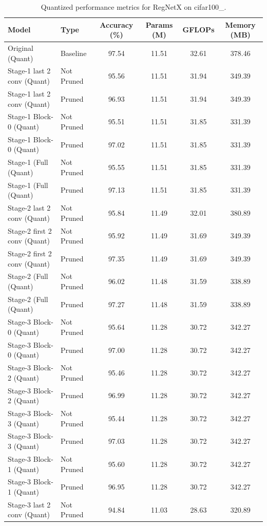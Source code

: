 \begin{table}
\caption{Quantized performance metrics for RegNetX on cifar100_.}
\label{tab:RegNetX_cifar100__quant}
\begin{tabular}{llcccc}
\toprule
Model & Type & Accuracy (\%) & Params (M) & GFLOPs & Memory (MB) \\
\midrule
Original
(Quant) & Baseline & 97.54 & 11.51 & 32.61 & 378.46 \\
Stage-1 last 2 conv
(Quant) & Not Pruned & 95.56 & 11.51 & 31.94 & 349.39 \\
Stage-1 last 2 conv
(Quant) & Pruned & 96.93 & 11.51 & 31.94 & 349.39 \\
Stage-1 Block-0
(Quant) & Not Pruned & 95.51 & 11.51 & 31.85 & 331.39 \\
Stage-1 Block-0
(Quant) & Pruned & 97.02 & 11.51 & 31.85 & 331.39 \\
Stage-1 (Full
(Quant) & Not Pruned & 95.55 & 11.51 & 31.85 & 331.39 \\
Stage-1 (Full
(Quant) & Pruned & 97.13 & 11.51 & 31.85 & 331.39 \\
Stage-2 last 2 conv
(Quant) & Not Pruned & 95.84 & 11.49 & 32.01 & 380.89 \\
Stage-2 first 2 conv
(Quant) & Not Pruned & 95.92 & 11.49 & 31.69 & 349.39 \\
Stage-2 first 2 conv
(Quant) & Pruned & 97.35 & 11.49 & 31.69 & 349.39 \\
Stage-2 (Full
(Quant) & Not Pruned & 96.02 & 11.48 & 31.59 & 338.89 \\
Stage-2 (Full
(Quant) & Pruned & 97.27 & 11.48 & 31.59 & 338.89 \\
Stage-3 Block-0
(Quant) & Not Pruned & 95.64 & 11.28 & 30.72 & 342.27 \\
Stage-3 Block-0
(Quant) & Pruned & 97.00 & 11.28 & 30.72 & 342.27 \\
Stage-3 Block-2
(Quant) & Not Pruned & 95.46 & 11.28 & 30.72 & 342.27 \\
Stage-3 Block-2
(Quant) & Pruned & 96.99 & 11.28 & 30.72 & 342.27 \\
Stage-3 Block-3
(Quant) & Not Pruned & 95.44 & 11.28 & 30.72 & 342.27 \\
Stage-3 Block-3
(Quant) & Pruned & 97.03 & 11.28 & 30.72 & 342.27 \\
Stage-3 Block-1
(Quant) & Not Pruned & 95.60 & 11.28 & 30.72 & 342.27 \\
Stage-3 Block-1
(Quant) & Pruned & 96.95 & 11.28 & 30.72 & 342.27 \\
Stage-3 last 2 conv
(Quant) & Not Pruned & 94.84 & 11.03 & 28.63 & 320.89 \\

\end{tabular}
\end{table}
